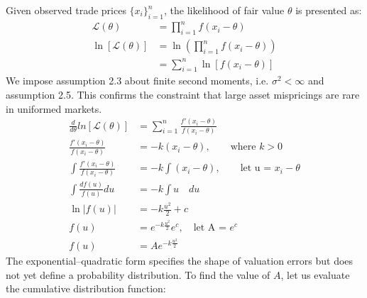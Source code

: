 \documentclass[12pt]{article}
\theoremstyle{plain}
\theoremstyle{definition}
\numberwithin{equation}{section}
\begin{document}
Given observed trade prices $\{x_i\}^{n}_{i= 1}$, the likelihood of fair value $\theta$ is presented as:
\begin{align}
\mathcal{L} (\theta) &= \prod^n_{i =1} f(x_i - \theta)\\
\ln [\mathcal{L}(\theta)] &= \ln {(\prod^n_{i =1} f(x_i - \theta))}\\
&= \sum^n_{i =1} {\ln\left[f(x_i - \theta)\right]}
\end{align}
We impose assumption 2.3 about finite second moments, i.e. $\sigma^2 <\infty$ and assumption 2.5. This confirms the constraint that large asset mispricings are rare in uniformed markets.
\begin{align}
\frac{d}{d\theta}ln[\mathcal{L}(\theta)] &= \sum^n_{i =1}\frac{f'(x_i - \theta)}{f(x_i - \theta)}\\
\frac{f'(x_i - \theta)}{f(x_i - \theta)} &= -k  (x_i - \theta), \qquad \text{where $k > 0$}\\
\int\frac{f'(x_i - \theta)}{f(x_i - \theta)} &= -k \int  (x_i - \theta), \qquad \text{let  u = $x_i - \theta$}\\
\int \frac{df(u)}{f(u)} du &= -k\int u\quad du \\
\ln |f(u)| &= -k \frac{u^2}{2} + c\\
f(u) &=  e^{-k\frac{u^2}{2}} e^c, \quad \text{let A = $e^c$} \\
f(u) &= A e^{-k\frac{u^2}{2}}
\end{align}
The exponential–quadratic form specifies the shape of valuation errors but does not yet define a probability distribution. To find the value of $A$, let us evaluate the cumulative distribution function: 
\end{document}
